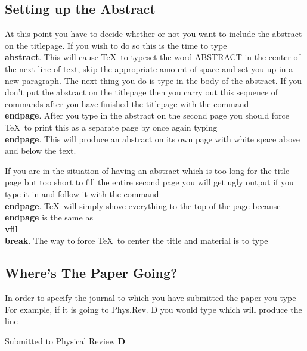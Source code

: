 \subsection{Setting up the Abstract}
 
At this point you have to decide whether or not you want to
include the abstract on the titlepage.
If you wish to do so this is the time to type
{\bf \\abstract}.
This will cause \TeX\ to typeset the word ABSTRACT in the center
of the next line of text, skip the appropriate amount of space
and set you up in a new paragraph.
The next thing you do is type in the body of the abstract.
If you don't put the abstract on the titlepage then you
carry out this sequence of commands after you have finished the
titlepage with the command {\bf \\endpage}.
After you type in the abstract on the second page you should force
\TeX\ to print this as a separate page by once again typing
{\bf \\endpage}.
This will produce an abstract on its own page with white space
above and below the text.
 
If you are in the situation of having an abstract which is too
long for the title page but too short to fill the entire
second page you will get ugly output if you type it in
and follow it with the command {\bf \\endpage}.
\TeX\ will simply shove everything to the top of the
page because {\bf \\endpage} is the same as {\bf \\vfil\\break}.
The way to force \TeX\ to center the title and material is to type
\tc{\\vfil}
\tcon{\\abstract}
\tcon{\\endpage}
 
\subsection{Where's The Paper Going?}
 
In order to specify the journal to which you have submitted the paper
you type
For example, if it is going to Phys.Rev. D you would type
which will produce the line \nextline
\centerline{ Submitted to Physical Review \bf D}
 
